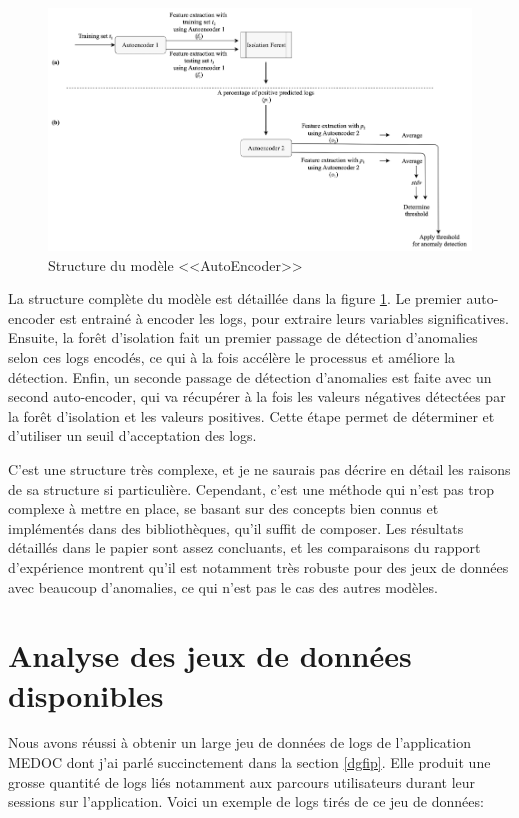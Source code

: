 \documentclass[openany, 11pt]{memoir}
\begin{document}
\begin{figure}[ht]
	\centering
	\includegraphics[width=\textwidth]{images/modeleautoencoder.png}
	\caption{Structure du modèle <<AutoEncoder>>}
	\label{modeleautoencoder}
\end{figure}

\bigskip
La structure complète du modèle est détaillée dans la figure \ref{modeleautoencoder}. Le premier auto-encoder est entrainé à encoder les \glspl{log}, pour extraire leurs variables significatives. Ensuite, la forêt d'isolation fait un premier passage de détection d'anomalies selon ces logs encodés, ce qui à la fois accélère le processus et améliore la détection. Enfin, un seconde passage de détection d'anomalies est faite avec un second auto-encoder, qui va récupérer à la fois les valeurs négatives détectées par la forêt d'isolation et les valeurs positives. Cette étape permet de déterminer et d'utiliser un seuil d'acceptation des logs.

C'est une structure très complexe, et je ne saurais pas décrire en détail les raisons de sa structure si particulière. Cependant, c'est une méthode qui n'est pas trop complexe à mettre en place, se basant sur des concepts bien connus et implémentés dans des bibliothèques, qu'il suffit de composer. Les résultats détaillés dans le papier sont assez concluants, et les comparaisons du rapport d'expérience \cite{experiencereport} montrent qu'il est notamment très robuste pour des jeux de données avec beaucoup d'anomalies, ce qui n'est pas le cas des autres modèles.

\newpage
\section{Analyse des jeux de données disponibles}

Nous avons réussi à obtenir un large jeu de données de \glspl{log} de l'application \gls{MEDOC} dont j'ai parlé succinctement dans la section \ref{dgfip}. Elle produit une grosse quantité de logs liés notamment aux parcours utilisateurs durant leur sessions sur l'application. Voici un exemple de logs tirés de ce jeu de données:
\end{document}
